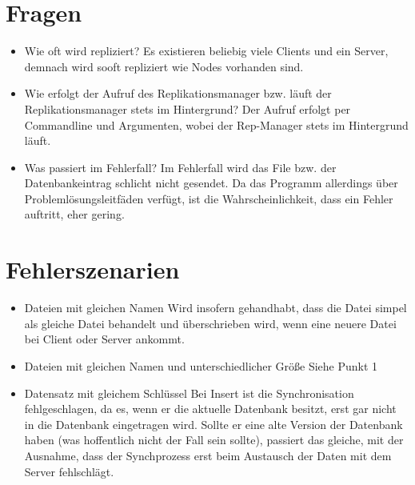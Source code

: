 \documentclass[a4paper,12pt]{scrreprt}
\begin{document}
\section{Fragen}
\begin{itemize}
\item Wie oft wird repliziert?
\subitem Es existieren beliebig viele Clients und ein Server, demnach wird sooft repliziert wie Nodes vorhanden sind.
\item Wie erfolgt der Aufruf des Replikationsmanager bzw. läuft der Replikationsmanager stets im Hintergrund?
\subitem Der Aufruf erfolgt per Commandline und Argumenten, wobei der Rep-Manager stets im Hintergrund läuft.
\item Was passiert im Fehlerfall?
\subitem Im Fehlerfall wird das File bzw. der Datenbankeintrag schlicht nicht gesendet. Da das Programm allerdings über Problemlösungsleitfäden verfügt, ist die Wahrscheinlichkeit, dass ein Fehler auftritt, eher gering. 
\end{itemize}
\section{Fehlerszenarien}
\begin{itemize}
\item Dateien mit gleichen Namen
\subitem Wird insofern gehandhabt, dass die Datei simpel als gleiche Datei behandelt und überschrieben wird, wenn eine neuere Datei bei Client oder Server ankommt.
\item Dateien mit gleichen Namen und unterschiedlicher Größe
\subitem Siehe Punkt 1
\item Datensatz mit gleichem Schlüssel
\subitem Bei Insert ist die Synchronisation fehlgeschlagen, da es, wenn er die aktuelle Datenbank besitzt, erst gar nicht in die Datenbank eingetragen wird. Sollte er eine alte Version der Datenbank haben (was hoffentlich nicht der Fall sein sollte), passiert das gleiche, mit der Ausnahme, dass der Synchprozess erst beim Austausch der Daten mit dem Server fehlschlägt.
\end{itemize}
 
 
\end{document}
